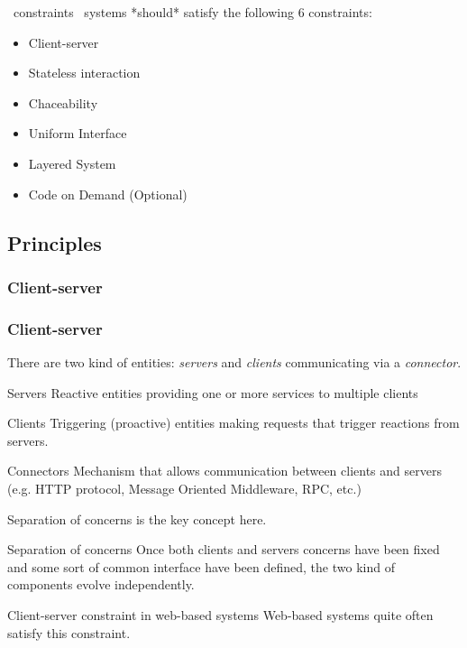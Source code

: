\begin{frame}[allowframebreaks]
	\begin{block}{\rest\ constraints}
		\restful\ systems *should* satisfy the following 6 constraints:
		\begin{itemize} 
			\item Client-server
			\item Stateless interaction
			\item Chaceability
			\item Uniform Interface
			\item Layered System
			\item Code on Demand (Optional)
		\end{itemize}
		 
	\end{block}

\end{frame}

\subsection{Principles}

\subsubsection{Client-server}

\begin{frame}[allowframebreaks]
	\frametitle{Client-server}
	There are two kind of entities: \emph{servers} and \emph{clients} communicating via a \emph{connector}.
	
	\begin{block}{Servers}
		Reactive entities providing one or more services to multiple clients
	\end{block}
	
	\begin{block}{Clients}
		Triggering (proactive) entities making requests that trigger reactions from servers.
	\end{block}
	
	\begin{block}{Connectors}
		Mechanism that allows communication between clients and servers (e.g. HTTP protocol, Message Oriented Middleware, RPC, etc.)
	\end{block}
	
	\framebreak

	Separation of concerns is the key concept here.
	
	\begin{block}{Separation of concerns}
		Once both clients and servers concerns have been fixed and some sort of common interface have been defined, the two kind of components evolve independently.
	\end{block}
	
	\begin{exampleblock}{Client-server constraint in web-based systems}
		Web-based systems quite often satisfy this constraint.
	\end{exampleblock}
	
\end{frame}

